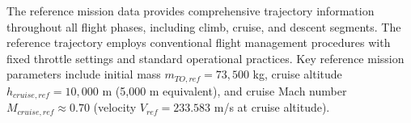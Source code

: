 The reference mission data provides comprehensive trajectory information throughout all flight phases, including climb, cruise, and descent segments. The reference trajectory employs conventional flight management procedures with fixed throttle settings and standard operational practices. Key reference mission parameters include initial mass $m_{TO,ref} = 73,500$ kg, cruise altitude $h_{cruise,ref} = 10,000$ m (5,000 m equivalent), and cruise Mach number $M_{cruise,ref} \approx 0.70$ (velocity $V_{ref} = 233.583$ m/s at cruise altitude).
